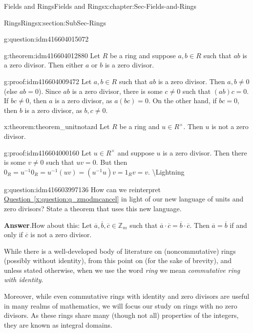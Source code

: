 \documentclass[oneside,10pt,]{book}
\numberwithin{equation}{section}
\def\Z{{\mathbb Z}}
\begin{document}
\begin{chapterptx}{Fields and Rings}{}{Fields and Rings}{}{}{x:chapter:Sec-Fields-and-Rings}
\begin{sectionptx}{Rings}{}{Rings}{}{}{x:section:SubSec-Rings}
\begin{question}{}{g:question:idm416604015072}
\end{question}
\begin{theorem}{}{}{g:theorem:idm416604012880}%
Let \(R\) be a ring and suppose \(a,b\in R\) such that \(ab\) is a zero divisor. Then either \(a\) or \(b\) is a zero divisor.%
\end{theorem}
\begin{proofptx}{}{g:proof:idm416604009472}
Let \(a,b\in R\) such that \(ab\) is a zero divisor. Then \(a,b\ne 0\) (else \(ab = 0\)). Since \(ab\) is a zero divisor, there is some \(c\ne 0\) such that \((ab) c = 0\). If \(bc\ne 0\), then \(a\) is a zero divisor, as \(a(bc) = 0\). On the other hand, if \(bc=0\), then \(b\) is a zero divisor, as \(b,c\ne 0\).%
\end{proofptx}
\begin{theorem}{}{}{x:theorem:theorem_unitnotazd}%
Let \(R\) be a ring and \(u\in R^\times\). Then \(u\) is not a zero divisor.%
\end{theorem}
\begin{proofptx}{}{g:proof:idm416604000160}
Let \(u\in R^\times\) and suppose \(u\) is a zero divisor. Then there is some \(v\ne 0\) such that \(uv = 0\). But then \(0_R = u^{-1} 0_R = u^{-1} (uv) = (u^{-1} u) v = 1_R v = v\). \textbackslash{}Lightning%
\end{proofptx}
\begin{question}{}{g:question:idm416603997136}%
How can we reinterpret \hyperref[x:question:q_zmodmcancel]{Question~\ref{x:question:q_zmodmcancel}} in light of our new language of units and zero divisors? State a theorem that uses this new language.%
\par\smallskip%
\noindent\textbf{Answer}.\hypertarget{g:answer:idm416603995216}{}\quad{}How about this: Let \(\overline{a},\overline{b},\overline{c}\in \Z_m\) such that \(\overline{a}\cdot \overline{c} = \overline{b}\cdot \overline{c}\). Then \(\overline{a} = \overline{b}\) if and only if \(\overline{c}\) is not a zero divisor.%
\end{question}
While there is a well-developed body of literature on (noncommutative) rings (possibly without identity), from this point on (for the sake of brevity), and unless stated otherwise, when we use the word \emph{ring} we mean \emph{commutative ring with identity}.%
\par
Moreover, while even commutative rings with identity and zero divisors are useful in many realms of mathematics, we will focus our study on rings with no zero divisors. As these rings share many (though not all) properties of the integers, they are known as integral domains.%

\end{sectionptx}
\end{chapterptx}
\end{document}
